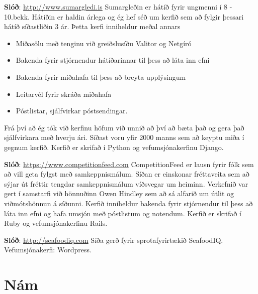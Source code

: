 \documentclass{cv_styles}
\begin{document}
\textbf{Slóð}: \href{http://www.sumargledi.is}{http://www.sumargledi.is} \newline
Sumargleðin er hátíð fyrir ungmenni í 8 - 10.bekk. Hátíðin er haldin árlega og ég hef séð um kerfið sem að fylgir þessari hátíð síðastliðin 3 ár. Þetta kerfi inniheldur meðal annars
\begin{itemize}
    \item Miðasölu með tenginu við greiðslusíðu Valitor og Netgíró
    \item Bakenda fyrir stjórnendur hátíðarinnar til þess að láta inn efni
    \item Bakenda fyrir miðahafa til þess að breyta upplýsingum
    \item Leitarvél fyrir skráða miðahafa
    \item Póstlistar, sjálfvirkar póstsendingar.
\end{itemize}
Frá því að ég tók við kerfinu höfum við unnið að því að bæta það og gera það sjálfvirkara með hverju ári. Síðast voru yfir 2000 manns sem að keyptu miða í gegnum kerfið. 
Kerfið er skrifað í Python og vefumsjónakerfinu Django.

\textbf{Slóð}: \href{https://www.competitionfeed.com}{https://www.competitionfeed.com} \newline
CompetitionFeed er lausn fyrir fólk sem að vill geta fylgst með samkeppnismálum. Síðan er einskonar fréttaveita sem að sýjar út fréttir tengdar samkeppnismálum víðsvegar um heiminn. Verkefnið var gert í samstarfi við hönnuðinn Owen Hindley sem að sá alfarið um útlit og viðmótshönnun á síðunni. Kerfið inniheldur bakenda fyrir stjórnendur til þess að láta inn efni og hafa umsjón með póstlistum og notendum. Kerfið er skrifað í Ruby og vefumsjónakerfinu Rails.

\textbf{Slóð}: \href{http://seafoodiq.com/}{http://seafoodiq.com} \newline
Síða gerð fyrir sprotafyrirtækið SeafoodIQ. Vefumsjónakerfi: Wordpress.

\newpage
\section{Nám}
\hfill \break
\end{document}
